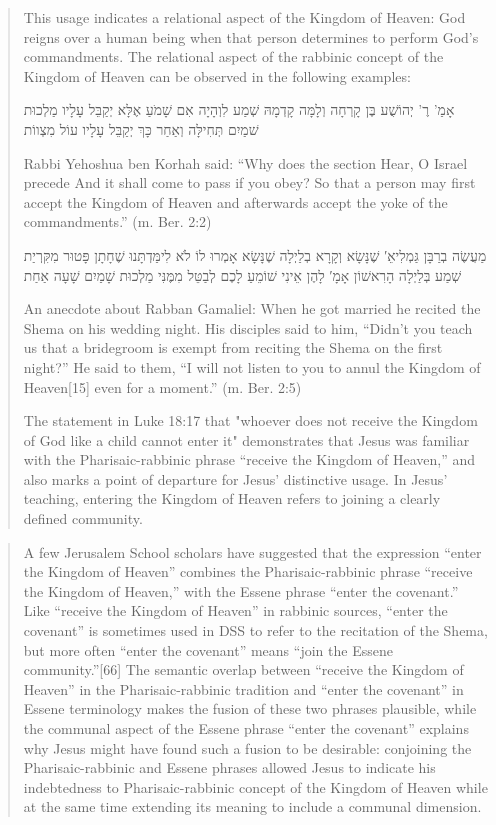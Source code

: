 \documentclass[11pt]{article}
\begin{document}
\begin{quote}
 This usage indicates a relational aspect of the Kingdom of Heaven: God reigns over a human being when that person determines to perform God’s commandments. The relational aspect of the rabbinic concept of the Kingdom of Heaven can be observed in the following examples: 
 
\begin{hebrew}
אָמַ' רֶ' יְהוֹשֻׁע בֶּן קָרְחָה וְלָמָּה קָדְמָהּ שְׁמַע לִוְהָיָה אִם שָׁמֹעַ אֶלָּא יְקַבֵּל עָלָיו מַלְכוּת שׁמַיִם תְּחִילָּה וְאַחַר כָּךְ יְקַבֵּל עָלָיו עוֹל מִצְווֹת
\end{hebrew}

Rabbi Yehoshua ben Korhah said: “Why does the section Hear, O Israel precede And it shall come to pass if you obey? So that a person may first accept the Kingdom of Heaven and afterwards accept the yoke of the commandments.” (m. Ber. 2:2)

\begin{hebrew}
מַעֲשֶׂה בְרַבָּן גַּמְלִיאֵ′ שֶׁנָּשָׂא וְקָרָא בְלַיְלָה שֶׁנָּשָׂא אָמְרוּ לוֹ לֹא לִימַּדְתָּנוּ שֶׁחָתָן פָּטוּר מִקִּרְיַת שְׁמַע בְּלַיְלָה הָרִאשׁוֹן אָמָ′ לָהֶן אֵינִי שׁוֹמֵעַ לָכֶם לְבַטֵּל מִמֶּנִּי מַלְכוּת שָׁמַיִם שָׁעָה אַחַת
\end{hebrew}

An anecdote about Rabban Gamaliel: When he got married he recited the Shema on his wedding night. His disciples said to him, “Didn’t you teach us that a bridegroom is exempt from reciting the Shema on the first night?” He said to them, “I will not listen to you to annul the Kingdom of Heaven[15] even for a moment.” (m. Ber. 2:5)

The statement in Luke 18:17 that "whoever does not receive the Kingdom of God like a child cannot enter it" demonstrates that Jesus was familiar with the Pharisaic-rabbinic phrase “receive the Kingdom of Heaven,” and also marks a point of departure for Jesus’ distinctive usage. In Jesus’ teaching, entering the Kingdom of Heaven refers to joining a clearly defined community. \cite{kingdom of heaven jp}
\end{quote}
\begin{quote}
A few Jerusalem School scholars have suggested that the expression “enter the Kingdom of Heaven” combines the Pharisaic-rabbinic phrase “receive the Kingdom of Heaven,” with the Essene phrase “enter the covenant.” Like “receive the Kingdom of Heaven” in rabbinic sources, “enter the covenant” is sometimes used in DSS to refer to the recitation of the Shema, but more often “enter the covenant” means “join the Essene community.”[66] The semantic overlap between “receive the Kingdom of Heaven” in the Pharisaic-rabbinic tradition and “enter the covenant” in Essene terminology makes the fusion of these two phrases plausible, while the communal aspect of the Essene phrase “enter the covenant” explains why Jesus might have found such a fusion to be desirable: conjoining the Pharisaic-rabbinic and Essene phrases allowed Jesus to indicate his indebtedness to Pharisaic-rabbinic concept of the Kingdom of Heaven while at the same time extending its meaning to include a communal dimension. \cite{kingdom of heaven jp}
\end{quote} 
\end{document}
